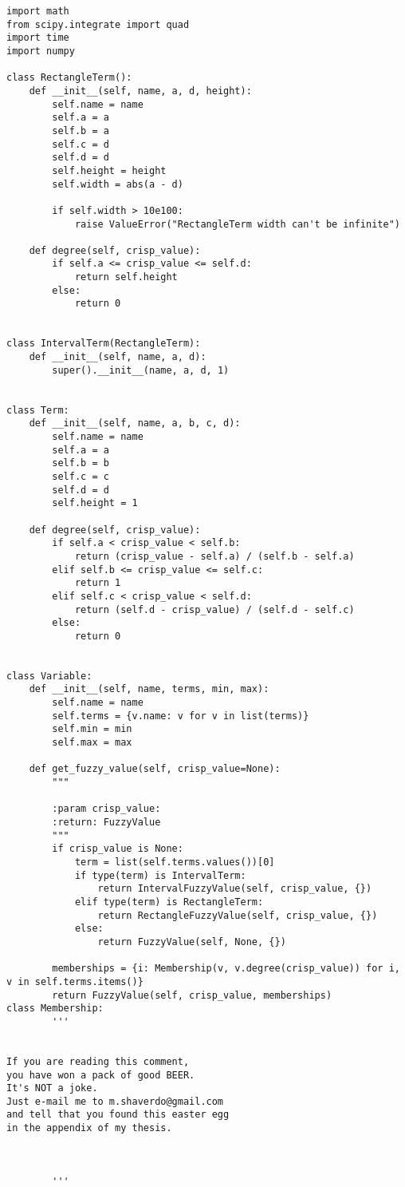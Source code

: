 \begin{lstlisting}[style=pythonstyle,caption={ }, label=lst:func:1]
import math
from scipy.integrate import quad
import time
import numpy

class RectangleTerm():
	def __init__(self, name, a, d, height):
		self.name = name
		self.a = a
		self.b = a
		self.c = d
		self.d = d
		self.height = height
		self.width = abs(a - d)

		if self.width > 10e100:
			raise ValueError("RectangleTerm width can't be infinite")

	def degree(self, crisp_value):
		if self.a <= crisp_value <= self.d:
			return self.height
		else:
			return 0


class IntervalTerm(RectangleTerm):
	def __init__(self, name, a, d):
		super().__init__(name, a, d, 1)


class Term:
	def __init__(self, name, a, b, c, d):
		self.name = name
		self.a = a
		self.b = b
		self.c = c
		self.d = d
		self.height = 1

	def degree(self, crisp_value):
		if self.a < crisp_value < self.b:
			return (crisp_value - self.a) / (self.b - self.a)
		elif self.b <= crisp_value <= self.c:
			return 1
		elif self.c < crisp_value < self.d:
			return (self.d - crisp_value) / (self.d - self.c)
		else:
			return 0


class Variable:
	def __init__(self, name, terms, min, max):
		self.name = name
		self.terms = {v.name: v for v in list(terms)}
		self.min = min
		self.max = max

	def get_fuzzy_value(self, crisp_value=None):
		"""

		:param crisp_value:
		:return: FuzzyValue
		"""
		if crisp_value is None:
			term = list(self.terms.values())[0]
			if type(term) is IntervalTerm:
				return IntervalFuzzyValue(self, crisp_value, {})
			elif type(term) is RectangleTerm:
				return RectangleFuzzyValue(self, crisp_value, {})
			else:
				return FuzzyValue(self, None, {})

		memberships = {i: Membership(v, v.degree(crisp_value)) for i, v in self.terms.items()}
		return FuzzyValue(self, crisp_value, memberships)
class Membership:
        '''
        
        
If you are reading this comment, 
you have won a pack of good BEER.
It's NOT a joke. 
Just e-mail me to m.shaverdo@gmail.com
and tell that you found this easter egg 
in the appendix of my thesis.
     
     
     
        '''


\end{lstlisting}
